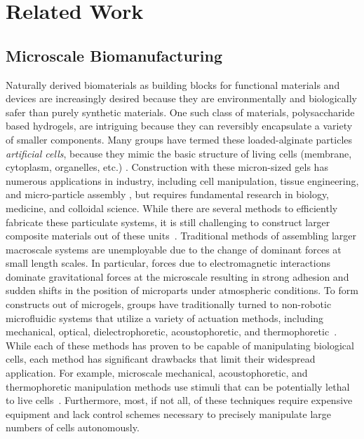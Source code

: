 \section{Related Work}\label{sec:RelatedWork}


\subsection{Microscale Biomanufacturing}
Naturally derived biomaterials as building blocks for functional materials and devices are increasingly desired because they are environmentally and biologically safer than purely synthetic materials. 
One such class of materials, polysaccharide based hydrogels, are intriguing because they can reversibly encapsulate a variety of smaller components. Many groups have termed these loaded-alginate particles  \emph{artificial cells}, because they mimic the basic structure of living cells (membrane, cytoplasm, organelles, etc.) \cite{chang2005therapeutic,prakash2007artificial,chang2007artificial}. 
Construction with these micron-sized gels has numerous applications in industry, including cell manipulation, tissue engineering, and micro-particle assembly \cite{weibel2007microfabrication,abbott2007robotics,yi2006microfluidics,castillo2009manipulation,sitti2015biomedical}, but requires fundamental research in biology, medicine, and colloidal science. 
While there are several methods to efficiently fabricate these particulate systems, it is still challenging to construct larger composite materials out of these units~\cite{assal2015highlights}. Traditional methods of assembling larger macroscale systems are unemployable due to the change of dominant forces at small length scales. 
In particular, forces due to electromagnetic interactions dominate gravitational forces at the microscale resulting in strong adhesion and sudden shifts in the position of microparts under atmospheric conditions. 
To form constructs out of microgels, groups have traditionally turned to non-robotic microfluidic systems that utilize a variety of actuation methods, including mechanical, optical, dielectrophoretic, acoustophoretic, and thermophoretic~\cite{desai2007engineering, chiou2005massively,shields2015microfluidic,augustsson2009decomplexing,vigolo2010thermophoresis}. 
While each of these methods has proven to be capable of manipulating biological cells, each method has significant drawbacks that limit their widespread application. 
For example, microscale mechanical, acoustophoretic, and thermophoretic manipulation methods use stimuli that can be potentially lethal to live cells~\cite{lin2012application}. 
Furthermore, most, if not all, of these techniques require expensive equipment and lack control schemes necessary to precisely manipulate large numbers of cells autonomously.

